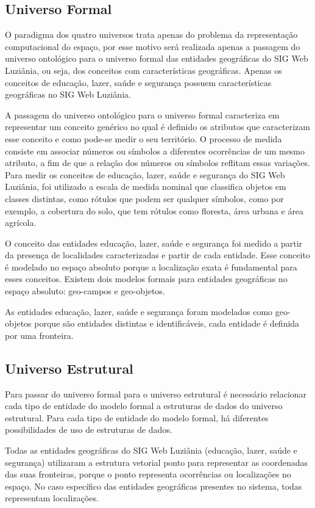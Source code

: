 \subsection{Universo Formal}

O paradigma dos quatro universos trata apenas do problema da representação computacional do espaço, por esse motivo será realizada apenas a passagem do universo ontológico para o universo formal das entidades geográficas do SIG Web Luziânia, ou seja, dos conceitos com características geográficas. Apenas os conceitos de educação, lazer, saúde e segurança possuem características geográficas no SIG Web Luziânia.

A passagem do universo ontológico para o universo formal caracteriza em representar um conceito genérico no qual é definido os atributos que caracterizam esse conceito e como pode-se medir o seu território. O processo de medida consiste em associar números ou símbolos a diferentes ocorrências de um mesmo atributo, a fim de que a relação dos números ou símbolos reflitam essas variações. Para medir os conceitos de educação, lazer, saúde e segurança do SIG Web Luziânia, foi utilizado a escala de medida nominal que classifica objetos em classes distintas, como rótulos que podem ser qualquer símbolos, como por exemplo, a cobertura do solo, que tem rótulos como floresta, área urbana e área agrícola.

O conceito das entidades educação, lazer, saúde e segurança foi medido a partir da presença de localidades caracterizadas e partir de cada entidade. Esse conceito é modelado no espaço absoluto porque a localização exata é fundamental para esses conceitos. Existem dois modelos formais para entidades geográficas no espaço absoluto: geo-campos e geo-objetos.

As entidades educação, lazer, saúde e segurança foram modelados como geo-objetos porque são entidades distintas e identificáveis, cada entidade é definida por uma fronteira.

\subsection{Universo Estrutural}

Para passar do universo formal para o universo estrutural é necessário relacionar cada tipo de entidade do modelo formal a estruturas de dados do universo estrutural. Para cada tipo de entidade do modelo formal, há diferentes possibilidades de uso de estruturas de dados.

Todas as entidades geográficas do SIG Web Luziânia (educação, lazer, saúde e segurança) utilizaram a estrutura vetorial ponto para representar as coordenadas das suas fronteiras, porque o ponto representa ocorrências ou localizações no espaço. No caso específico das entidades geográficas presentes no sistema, todas representam localizações.

